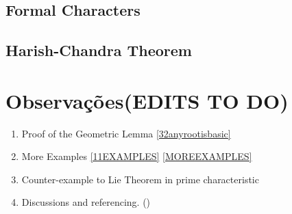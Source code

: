 \documentclass[svgnames,12pt,oneside, openright,a4paper]{scrbook}
\begin{document}
\section{Formal Characters}
\section{Harish-Chandra Theorem}
\chapter{Observações(EDITS TO DO)}
\begin{enumerate}
	\item Proof of the Geometric Lemma \ref{32anyrootisbasic}
	\item More Examples \ref{11EXAMPLES} \ref{MOREEXAMPLES} 
	\item Counter-example to Lie Theorem in prime characteristic
	\item Discussions and referencing.
	(\cite{jacobson}\cite{humphreys2}\cite{sanmartin})
\end{enumerate}


\end{document}
